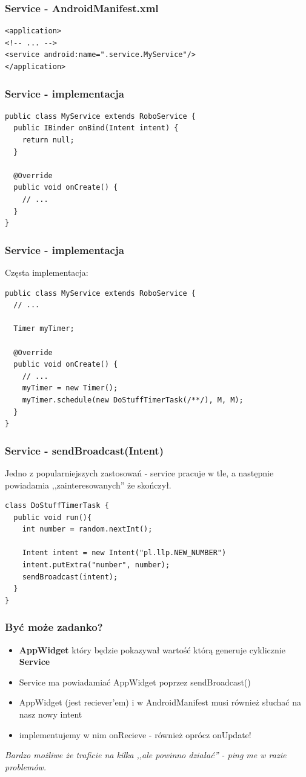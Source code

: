 \begin{frame}[fragile]\frametitle{Service - AndroidManifest.xml}
\begin{lstlisting}
<application>
<!-- ... -->
<service android:name=".service.MyService"/>
</application>
\end{lstlisting}
\end{frame}


\begin{frame}[fragile]\frametitle{Service - implementacja}
\begin{lstlisting}
public class MyService extends RoboService {
  public IBinder onBind(Intent intent) {
    return null;
  }

  @Override
  public void onCreate() {
    // ... 
  }
}
\end{lstlisting}
\end{frame}

\begin{frame}[fragile]\frametitle{Service - implementacja}
Częsta implementacja:
\begin{lstlisting}
public class MyService extends RoboService {
  // ...

  Timer myTimer;

  @Override
  public void onCreate() {
    // ... 
    myTimer = new Timer();
    myTimer.schedule(new DoStuffTimerTask(/**/), M, M);
  }
}
\end{lstlisting}
\end{frame}

\begin{frame}[fragile]\frametitle{Service - sendBroadcast(Intent)}
Jedno z popularniejszych zastosowań - service pracuje w tle, a następnie powiadamia ,,zainteresowanych'' że skończył.
\begin{lstlisting}
class DoStuffTimerTask {
  public void run(){
    int number = random.nextInt();

    Intent intent = new Intent("pl.llp.NEW_NUMBER")
    intent.putExtra("number", number);
    sendBroadcast(intent);
  }
}
\end{lstlisting}
\end{frame}

\begin{frame}\frametitle{Być może zadanko?}
\begin{itemize}
 \item \textbf{AppWidget} który będzie pokazywał wartość którą generuje cyklicznie \textbf{Service}
 \pause \item Service ma powiadamiać AppWidget poprzez sendBroadcast()
 \pause \item AppWidget (jest reciever'em) i w AndroidManifest musi również słuchać na nasz nowy intent
 \pause \item implementujemy w nim onRecieve - również oprócz onUpdate!
\end{itemize}
\pause \textit{Bardzo możliwe że traficie na kilka ,,ale powinno działać'' - ping me w razie problemów.}
\end{frame}

